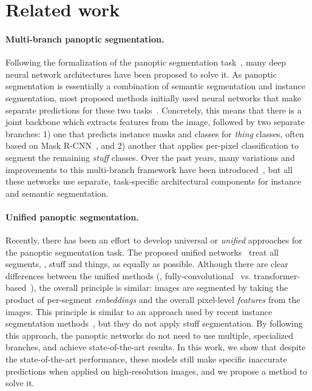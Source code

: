 \documentclass[10pt,twocolumn,letterpaper]{article}
\begin{document}
 \section{Related work}
\label{sec:related_work}
\paragraph{Multi-branch panoptic segmentation.}
Following the formalization of the panoptic segmentation task~\cite{kirillov2019ps}, many deep neural network architectures have been proposed to solve it. As panoptic segmentation is essentially a combination of semantic segmentation and instance segmentation, most proposed methods initially used neural networks that make separate predictions for these two tasks~\cite{degeus2018jsisnet,kirillov2019panopticfpn,li2019aunet,liu2019end,mohan2020efficientps,porzi2019seamless,xiong2019upsnet}. Concretely, this means that there is a joint backbone which extracts features from the image, followed by two separate branches: 1) one that predicts instance masks and classes for \textit{thing} classes, often based on Mask R-CNN~\cite{he2017maskrcnn}, and 2) another that applies per-pixel classification to segment the remaining \textit{stuff} classes. Over the past years, many variations and improvements to this multi-branch framework have been introduced~\cite{cheng2020pandeeplab,degeus2020fpsnet,gao2019ssap,li2020unifying,sofiiuk2019adaptis,yang2019deeperlab,yang2020sognet}, but all these networks use separate, task-specific architectural components for instance and semantic segmentation.



\paragraph{Unified panoptic segmentation.}
Recently, there has been an effort to develop universal or \textit{unified} approaches for the panoptic segmentation task. The proposed unified networks~\cite{cheng2021mask2former,cheng2021maskformer,li2021panopticfcn,wang2021maxdeeplab,zhang2021knet} treat all segments, \ie, stuff and things, as equally as possible. Although there are clear differences between the unified methods (\eg, fully-convolutional~\cite{li2021panopticfcn} vs. transformer-based~\cite{cheng2021mask2former,cheng2021maskformer}), the overall principle is similar: images are segmented by taking the product of per-segment \textit{embeddings} and the overall pixel-level \textit{features} from the images. This principle is similar to an approach used by recent instance segmentation methods~\cite{tian2020condinst,wang2020solov2}, but they do not apply stuff segmentation. By following this approach, the panoptic networks do not need to use multiple, specialized branches, and achieve state-of-the-art results. In this work, we show that despite the state-of-the-art performance, these models still make specific inaccurate predictions when applied on high-resolution images, and we propose a method to solve it.
\end{document}
